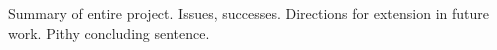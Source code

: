 Summary of entire project. Issues, successes. Directions for extension in future work. Pithy concluding sentence.